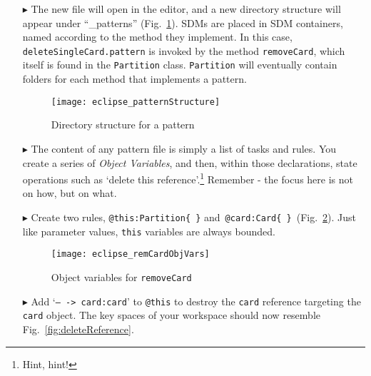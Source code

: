 \begin{itemize}
\item[$\blacktriangleright$] The new file will open in the editor, and a new directory structure will appear under ``\_patterns'' (Fig.~\ref{fig:pattStruct}). SDMs are
placed in SDM containers, named according to the method they implement. In this case, \texttt{deleteSingleCard.pattern} is invoked by the method \texttt{removeCard},
which itself is found in the \texttt{Partition} class. \texttt{Partition} will eventually contain folders for each method that implements a pattern.

\vspace{0.5cm}

\begin{figure}[htp]
\begin{center}
  \texttt{[image: eclipse\_patternStructure]}
  \caption{Directory structure for a pattern}
  \label{fig:pattStruct}
\end{center}
\end{figure}

\item[$\blacktriangleright$] The content of any pattern file is simply a list of tasks and rules. You create a series of \emph{Object Variables}, and then,
within those declarations, state operations such as `delete this reference'.\footnote{Hint, hint!} Remember - the focus here is not on how, but on what.

\vspace{0.5cm}

\item[$\blacktriangleright$] Create two rules, \texttt{@this:Partition\{ \}} and~\texttt{@card:Card\{ \}}~(Fig.~\ref{fig:remCardObjVar}). Just like parameter
values, \texttt{this} variables are always bounded.

\begin{figure}[htp]
\begin{center}
  \texttt{[image: eclipse\_remCardObjVars]}
  \caption{Object variables for \texttt{removeCard}}
  \label{fig:remCardObjVar}
\end{center}
\end{figure}

\clearpage

\item[$\blacktriangleright$] Add `\texttt{-- -> card:card}' to \texttt{@this} to destroy the \texttt{card} reference targeting the \texttt{card} object. The key
spaces of your workspace should now resemble Fig.~\ref{fig:deleteReference}.


\end{itemize}
